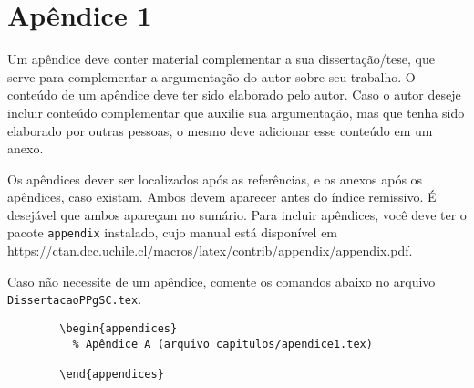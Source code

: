 \chapter{Apêndice 1}

Um apêndice deve conter material complementar a sua dissertação/tese, que serve para complementar a argumentação do autor sobre seu trabalho. O conteúdo de um apêndice deve ter sido elaborado pelo autor. Caso o autor deseje incluir conteúdo complementar que auxilie sua argumentação, mas que tenha sido elaborado por outras pessoas, o mesmo deve adicionar esse conteúdo em um anexo.

Os apêndices dever ser localizados após as referências, e os anexos após os apêndices, caso existam. Ambos devem aparecer antes do índice remissivo. É desejável que ambos apareçam no sumário. Para incluir apêndices, você deve ter o pacote \texttt{appendix} \parencite{appendix} instalado, cujo manual está disponível em \url{https://ctan.dcc.uchile.cl/macros/latex/contrib/appendix/appendix.pdf}.

Caso não necessite de um apêndice, comente os comandos abaixo no arquivo \texttt{DissertacaoPPgSC.tex}.

\begin{listing}[ht]
	\begin{verbatim}
		\begin{appendices}
		  % Apêndice A (arquivo capitulos/apendice1.tex)
		  
		\end{appendices}
	\end{verbatim}
	\caption{Exemplo de código \LaTeX{} usado para carregar um arquivo de apêndice.}
	\label{cod:appendix}
\end{listing}